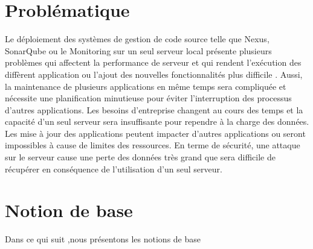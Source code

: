 \section{\LARGE Problématique }
\texttt{}
\textsf{\selectfont{}
    Le déploiement des systèmes de gestion de code source telle que Nexus, SonarQube ou le Monitoring sur un seul serveur local présente plusieurs problèmes qui affectent la performance de serveur et qui rendent l’exécution des diffèrent application ou l’ajout des nouvelles fonctionnalités plus difficile . Aussi, la maintenance de plusieurs applications en même temps sera compliquée et nécessite une planification minutieuse pour éviter l’interruption des processus d’autres applications. Les besoins d’entreprise changent au cours des temps et la capacité d'un seul serveur sera insuffisante pour rependre à la charge des données. Les mise à jour des applications peutent impacter d'autres applications ou seront impossibles à cause de limites des ressources. En terme de sécurité, une attaque sur le serveur cause une perte des données très grand que sera difficile de récupérer en conséquence de l’utilisation d'un seul serveur.
}

\section{\LARGE Notion de base}
\textsf{\selectfont{}Dans ce qui suit ,nous présentons les notions de base}

